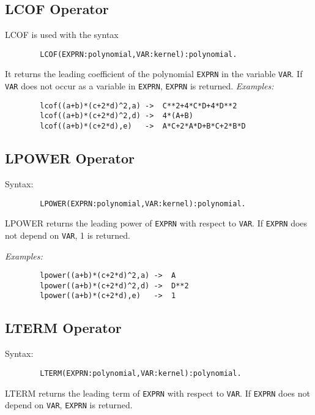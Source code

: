 \subsection{LCOF Operator}
\hypertarget{operator:LCOF}{}

LCOF is used with the syntax
\begin{verbatim}
        LCOF(EXPRN:polynomial,VAR:kernel):polynomial.
\end{verbatim}
It returns the leading coefficient of the
polynomial \texttt{EXPRN} in the variable \texttt{VAR}.  If \texttt{VAR} does not
occur as a variable in \texttt{EXPRN}, \texttt{EXPRN} is returned.
\textit{Examples:}
\begin{verbatim}
        lcof((a+b)*(c+2*d)^2,a) ->  C**2+4*C*D+4*D**2
        lcof((a+b)*(c+2*d)^2,d) ->  4*(A+B)
        lcof((a+b)*(c+2*d),e)   ->  A*C+2*A*D+B*C+2*B*D
\end{verbatim}

\subsection{LPOWER Operator}
\hypertarget{operator:LPOWER}{}

Syntax:
\begin{verbatim}
        LPOWER(EXPRN:polynomial,VAR:kernel):polynomial.
\end{verbatim}
LPOWER returns the leading power of \texttt{EXPRN} with respect to \texttt{VAR}.
If \texttt{EXPRN} does not depend on \texttt{VAR}, 1 is returned.

\textit{Examples:}
\begin{verbatim}
        lpower((a+b)*(c+2*d)^2,a) ->  A
        lpower((a+b)*(c+2*d)^2,d) ->  D**2
        lpower((a+b)*(c+2*d),e)   ->  1
\end{verbatim}

\subsection{LTERM Operator}
\hypertarget{operator:LTERM}{}

\begin{samepage}
Syntax:
\begin{verbatim}
        LTERM(EXPRN:polynomial,VAR:kernel):polynomial.
\end{verbatim}
LTERM returns the leading term of \texttt{EXPRN} with respect to \texttt{VAR}.
If \texttt{EXPRN} does not depend on \texttt{VAR}, \texttt{EXPRN} is returned.
\end{samepage}

